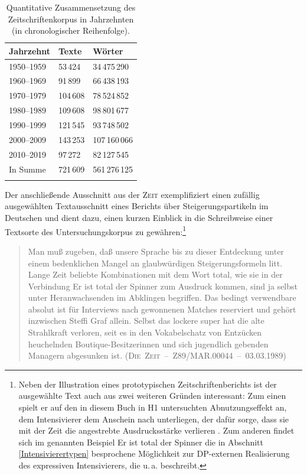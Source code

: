 %
\begin{table}
\begin{tabularx}{\textwidth}{lYY}
\lsptoprule
Jahrzehnt & Texte & Wörter \\
\midrule
1950--1959 & 53\,424 & 34\,475\,290\\ 
1960--1969 & 91\,899 & 66\,438\,193 \\
1970--1979 & 104\,608 & 78\,524\,852 \\
1980--1989 & 109\,608 & 98\,801\,677 \\
1990--1999 & 121\,545 & 93\,748\,502 \\
2000--2009 & 143\,253 & 107\,160\,066\\
2010--2019 & 97\,272 & {82\,127\,545} \\
\midrule
In Summe & 721\,609 & 561\,276\,125\\
\lspbottomrule
\end{tabularx}
\caption[Quantitative Zusammensetzung des Zeitschriftenkorpus]{Quantitative Zusammensetzung des Zeitschriftenkorpus in Jahrzehnten (in chronologischer Reihenfolge).}
\label{tab:ZuSa}
\end{table}

Der anschließende Ausschnitt aus der \textsc{Zeit} exemplifiziert einen zufällig ausgewählten Textausschnitt eines Berichts über Steigerungspartikeln im Deutschen und dient dazu, einen kurzen Einblick in die Schreibweise einer Textsorte des Untersuchungskorpus zu gewähren:\footnote{Neben der Illustration eines prototypischen Zeitschriftenberichts ist der ausgewählte Text auch aus zwei weiteren Gründen interessant: Zum einen spielt er auf den in diesem Buch in H1 untersuchten Abnutzungseffekt an, dem Intensivierer dem Anschein nach unterliegen, der dafür sorge, dass sie mit der Zeit die angestrebte Ausdrucksstärke verlieren \citep[vgl.][2]{Hauschild.1899}. Zum anderen findet sich im genannten Beispiel \glqq{}Er ist total der Spinner\grqq{} die in Abschnitt \ref{Intensivierertypen} besprochene Möglichkeit zur DP-externen Realisierung des expressiven Intensivierers, die u.\,a. \citet[]{Schlieben.1995} beschreibt.} 
 
 \begin{quote}
 Man muß zugeben, daß unsere Sprache bis zu dieser Entdeckung unter einem bedenklichen Mangel an glaubwürdigen Steigerungsformeln litt. Lange Zeit beliebte Kombinationen mit dem Wort \glqq{}total\grqq{}, wie sie in der Verbindung \glqq{}Er ist total der Spinner\grqq{} zum Ausdruck kommen, sind ja selbst unter Heranwachsenden im Abklingen begriffen. Das bedingt verwendbare \glqq{}absolut\grqq{} ist für Interviews nach gewonnenen Matches reserviert und gehört inzwischen Steffi Graf allein. Selbst das lockere \glqq{}super\grqq{} hat die alte Strahlkraft verloren, seit es in den Vokabelschatz von Entzücken heuchelnden Boutique-Besitzerinnen und sich jugendlich gebenden Managern abgesunken ist.   \hfill (\mbox{\textsc{Die Zeit} -- Z89/MAR.00044 -- 03.03.1989)}
\end{quote}

